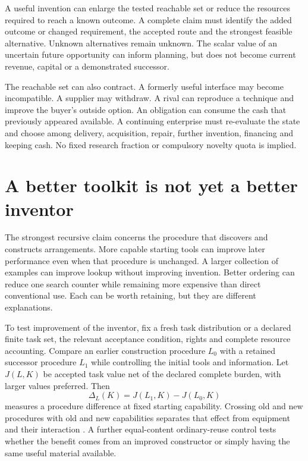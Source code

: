 A useful invention can enlarge the tested reachable set or reduce the resources required to reach a known outcome. A complete claim must identify the added outcome or changed requirement, the accepted route and the strongest feasible alternative. Unknown alternatives remain unknown. The scalar value of an uncertain future opportunity can inform planning, but does not become current revenue, capital or a demonstrated successor.

The reachable set can also contract. A formerly useful interface may become incompatible. A supplier may withdraw. A rival can reproduce a technique and improve the buyer's outside option. An obligation can consume the cash that previously appeared available. A continuing enterprise must re-evaluate the state and choose among delivery, acquisition, repair, further invention, financing and keeping cash. No fixed research fraction or compulsory novelty quota is implied.

\section{A better toolkit is not yet a better inventor}\label{sec:inventor}
The strongest recursive claim concerns the procedure that discovers and constructs arrangements. More capable starting tools can improve later performance even when that procedure is unchanged. A larger collection of examples can improve lookup without improving invention. Better ordering can reduce one search counter while remaining more expensive than direct conventional use. Each can be worth retaining, but they are different explanations.

To test improvement of the inventor, fix a fresh task distribution or a declared finite task set, the relevant acceptance condition, rights and complete resource accounting. Compare an earlier construction procedure $L_0$ with a retained successor procedure $L_1$ while controlling the initial tools and information. Let $J(L,K)$ be accepted task value net of the declared complete burden, with larger values preferred. Then
\begin{equation}
\Delta_L(K)=J(L_1,K)-J(L_0,K)
\end{equation}
measures a procedure difference at fixed starting capability. Crossing old and new procedures with old and new capabilities separates that effect from equipment and their interaction \cite{outaccelerate,superalpha}. A further equal-content ordinary-reuse control tests whether the benefit comes from an improved constructor or simply having the same useful material available.

